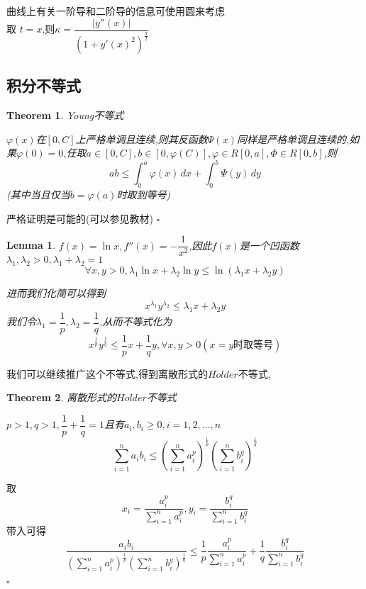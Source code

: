\documentclass[11pt,hyperref,a4paper,UTF8]{ctexart}
\newtheorem{theorem}{Theorem}[subsection]
\newtheorem{lemma}{Lemma}[subsection]
\newenvironment{cproof}{%
\heiti{证明}\kaishu
}{%
  \hfill $\square$
  \par\bigskip
}
\newcommand{\parameter}[1]{\left(#1\right)}
\newcommand{\abs}[1]{\left|#1\right|}
\begin{document}
\begin{CJK}{UTF8}{gkai}
曲线上有关一阶导和二阶导的信息可使用圆来考虑\\

取 $t = x$,则$\kappa =  \dfrac{\abs{y''(x)}}{(1 + y'(x)^2)^{\frac{3}{2}}}$

\subsection{积分不等式}

\begin{theorem}
  Young不等式

  $\varphi(x)$在$[0,C]$上严格单调且连续,则其反函数$\varPsi(x)$同样是严格单调且连续的,如果$\varphi(0) = 0$,任取$a \in [0,C],b\in[0,\varphi(C)],\varphi\in R[0,a],\varPhi \in R[0,b]$,则
  \[ab \leq \int_{0}^{a} \varphi(x) \, dx + \int_{0}^{b} \varPsi(y)\, dy\]
  (其中当且仅当$b = \varphi(a)$时取到等号)
\end{theorem}
\begin{cproof}
严格证明是可能的(可以参见教材)
\end{cproof}

\begin{lemma}
  
  $f(x) = \ln x , f''(x) = -\dfrac{1}{x^2}$,因此$f(x)$是一个凹函数$\lambda_1 ,\lambda_2 > 0 ,\lambda_1 + \lambda_2 =1$ \\
  \[\forall x,y > 0, \lambda_1 \ln x + \lambda_2 \ln y \leq \ln(\lambda_1 x + \lambda_2 y)\]
  
  进而我们化简可以得到\[x^{\lambda_1} y^{\lambda_2} \leq \lambda_1 x + \lambda_2 y\]
  我们令$\lambda_1 = \dfrac{1}{p},\lambda_2 = \dfrac{1}{q}$,从而不等式化为
  \[x^{\frac{1}{p}} y^{\frac{1}{q}} \leq \dfrac{1}{p}x + \dfrac{1}{q} y,\forall x,y >0 (x = y\text{时取等号})\]
  
\end{lemma}
我们可以继续推广这个不等式,得到离散形式的$H\ddot{o}lder$不等式,

\begin{theorem}
  离散形式的$H\ddot{o}lder$不等式

  $p > 1,q > 1 , \dfrac{1}{p } + \dfrac{1}{q} = 1$且有$a_i,b_i \geq 0,i = 1,2,\ldots,n$
  \[\sum_{i = 1}^n a_i b_i \leq \parameter{\sum_{i = 1}^n a_i^p}^{\frac{1}{p}} \parameter{\sum_{i = 1}^n b_i^q}^{\frac{1}{q}}\]
\end{theorem}

\begin{cproof}
取\[x_i = \dfrac{a_i^p}{\sum_{i = 1}^n a_i^p} , y_i = \dfrac{b_i^q}{\sum_{i =1 }^n b_i^q}\]
带入可得
\[\dfrac{a_i b_i}{\parameter{\sum_{i =1}^n  a_i^p}^{\frac{1}{p}}\parameter{\sum_{i = 1}^n b_i^q}^{\frac{1}{q}}}\leq \dfrac{1}{p}\dfrac{a_i^p}{\sum_{i = 1}^n a_i^p} + \dfrac{1}{q} \dfrac{b_i^q}{\sum_{i = 1}^n b_i^q}\]


\end{cproof}
\end{CJK}
\end{document}
